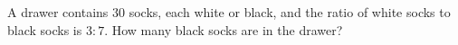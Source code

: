 A drawer contains $30$ socks, each white or black, and the ratio of white socks to black socks is $3:7$. How many black socks are in the drawer?
